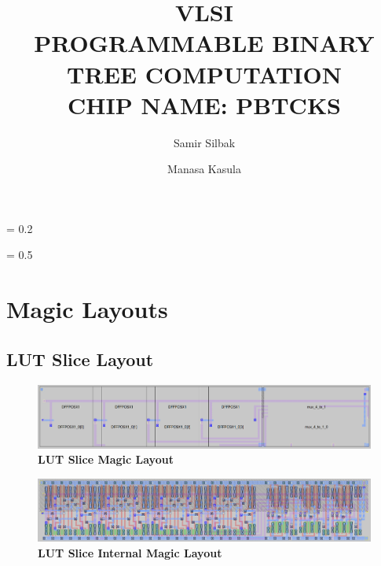 \documentclass[a4paper]{article}
\title{
    \vspace{2in}
    \textbf{VLSI \\}
    \vspace{10pt}
    \textbf{PROGRAMMABLE BINARY TREE COMPUTATION\\}
    \vspace{10pt}
    \textbf{CHIP NAME: PBTCKS}
    \vspace{2in}
}
\author[1]{Samir Silbak}
\author[2]{Manasa Kasula}
\affil[1]{silbaksr@mail.uc.edu}
\affil[2]{kasulama@mail.uc.edu
    \vspace{10pt}
}
\affil[1]{(513) 207-0687}
\affil[2]{(847) 612-7364
    \vspace{2.0in}
}
\begin{document}
%
\maketitle
\newpage
\parskip = 0.2\baselineskip
\newpage
\tableofcontents
\newpage
\listoffigures
\listoftables
\lstlistoflistings
\parskip = 0.5\baselineskip
\newpage

\newpage

\section{\textbf{Magic Layouts}}

\subsection{\textbf{LUT Slice Layout}}
    \begin{figure}[H]
        \centering
        \includegraphics[width=\textwidth,height=\textheight,keepaspectratio]{../../magic/pics/lut_slice.png}
        \caption{\textbf{LUT Slice Magic Layout}}
        \label{fig:gg}
    \end{figure}
    \begin{figure}[H]
        \centering
        \includegraphics[width=\textwidth,height=\textheight,keepaspectratio]{../../magic/pics/lut_slice_internal.png}
        \caption{\textbf{LUT Slice Internal Magic Layout}}
        \label{fig:gg}
    \end{figure}
\end{document}
